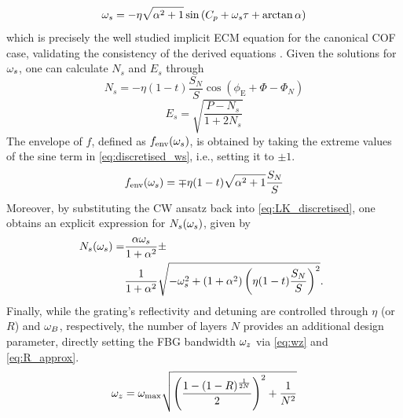 %
\begin{equation*}
    \omega_s = - \eta \sqrt{\alpha^2+1} \sin{(C_p + \omega_s \tau + \arctan\alpha)}
\end{equation*}
%
which is precisely the well studied implicit ECM equation for the canonical COF case, validating the consistency of the derived equations \cite{rottschafer2007ecm}.
Given the solutions for $\omega_s$, one can calculate $N_s$ and $E_s$ through
%
\begin{equation}
    N_s = -\eta (1-t) \frac{S_N}{S} \cos{\left( \phi_\text{E} + \Phi - \Phi_N \right)}  
\end{equation}
%
\begin{equation}
    E_s = \sqrt{\frac{P - N_s}{1 + 2 N_s}}
\end{equation}
%
The envelope of $f$, defined as $f_\text{env}(\omega_s)$, is obtained by taking the extreme values of the sine term in \eqref{eq:discretised_ws}, i.e., setting it to $\pm 1$.
%
\begin{equation}
    \label{eq:discretised_ws_envelope}
    f_\text{env}(\omega_s) = \mp \eta (1-t) \sqrt{\alpha^2+1}\frac{S_N}{S}
\end{equation}
%
Moreover, by substituting the CW ansatz back into \eqref{eq:LK_discretised}, one obtains an explicit expression for $N_s(\omega_s)$, given by
%
\begin{gather}
    \label{eq:discretised_Ns_curve}
    \begin{aligned}
        \hspace{-0.5em}N_s(\omega_s) = &\frac{\alpha \omega_s}{1+\alpha^2} \pm \\
                    &\frac{1}{1+\alpha^2}\sqrt{-\omega_s^2 + (1+\alpha^2) \left(\eta (1-t) \frac{S_N}{S} \right)^2}.
    \end{aligned}
\end{gather}
%
Finally, while the grating’s reflectivity and detuning are controlled through $\eta$ (or $R$) and $\omega_B$, respectively, the number of layers $N$ provides an additional design parameter, directly setting the FBG bandwidth $\omega_z$ via \eqref{eq:wz} and \eqref{eq:R_approx}.
%
\begin{equation}
    \label{eq:wztoN}
    \omega_z = \omega_\text{max} \sqrt{\left( \frac{1 - (1 - R)^\frac{1}{2N}}{2} \right)^2 + \frac{1}{N^2}}
\end{equation}
%
